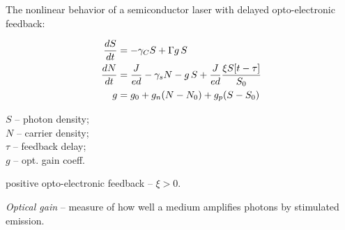 \newcommand{\red}[1]{\textcolor{black}{#1}}
\newcommand{\grey}[1]{\textcolor{black}{#1}}

The nonlinear behavior of a semiconductor laser with delayed
opto-electronic feedback:
\begin{minipage}{0.62\textwidth}
    \begin{align*}
        \frac{d S}{d t} &= - \grey{\gamma_C} S + \grey{\Gamma} g\, S \\
        \frac{d N}{d t} &= \grey{\frac{J}{ed}}  -  \grey{\gamma_s} N - g\, S + 
        \grey{\frac{J}{ed} \frac{\xi \red{S [t- \tau]}}{S_0}}
         \\
         \vspace{5mm} g &= \grey{g_0} + \grey{g_n}(N-\grey{N_0}) + \grey{g_p}(S-\grey{S_0})
    \end{align*}
\end{minipage}
\hfill
\begin{minipage}{0.36\textwidth}
    $S$ -- photon density; \\
    $N$ -- carrier density; \\
    $\tau$ -- feedback delay; \\
    $g$ -- opt. gain coeff.
\end{minipage}
positive opto-electronic feedback -- $\xi > 0$. 

\phantom{42}

\textit{Optical gain} -- measure of how well a medium amplifies photons by stimulated emission.
